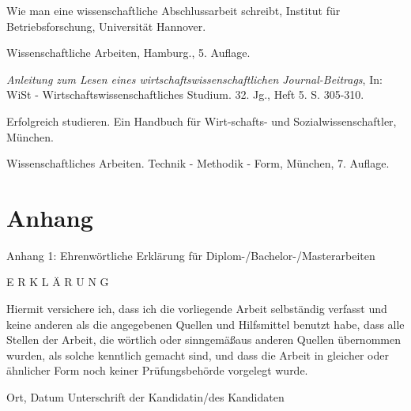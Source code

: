 \documentclass[a4paper, 12pt]{article}
\begin{document}
\begin{thebibliography}{}
 Wie man eine wissenschaftliche Abschlussarbeit
schreibt, Institut f\"{u}r Betriebsforschung, Universit\"{a}t Hannover.

 Wissenschaftliche Arbeiten, Hamburg., 5.
Auflage.

 \emph{Anleitung zum Lesen eines wirtschaftswissenschaftlichen
Journal-Beitrags}, In: WiSt - Wirtschaftswissenschaftliches Studium. 32. Jg., Heft
5. S. 305-310.

 Erfolgreich studieren. Ein Handbuch f\"{u}r
Wirt-schafts- und Sozialwissenschaftler, M\"{u}nchen.

 Wissenschaftliches Arbeiten. Technik -
Methodik - Form, M\"{u}nchen, 7. Auflage.

\end{thebibliography}

\newpage
\section*{Anhang}


Anhang 1: Ehrenw\"{o}rtliche Erkl\"{a}rung f\"{u}r Diplom-/Bachelor-/Masterarbeiten



E R K L \"{A} R U N G

Hiermit versichere ich, dass ich die vorliegende Arbeit selbst\"{a}ndig verfasst und
keine anderen als die angegebenen Quellen und Hilfsmittel benutzt habe, dass alle
Stellen der Arbeit, die w\"{o}rtlich oder sinngem\"{a}\ss  aus anderen Quellen \"{u}bernommen
wurden, als solche kenntlich gemacht sind, und dass die Arbeit in gleicher oder
\"{a}hnlicher Form noch keiner Pr\"{u}fungsbeh\"{o}rde vorgelegt wurde.

Ort, Datum Unterschrift der Kandidatin/des Kandidaten


\end{document}
